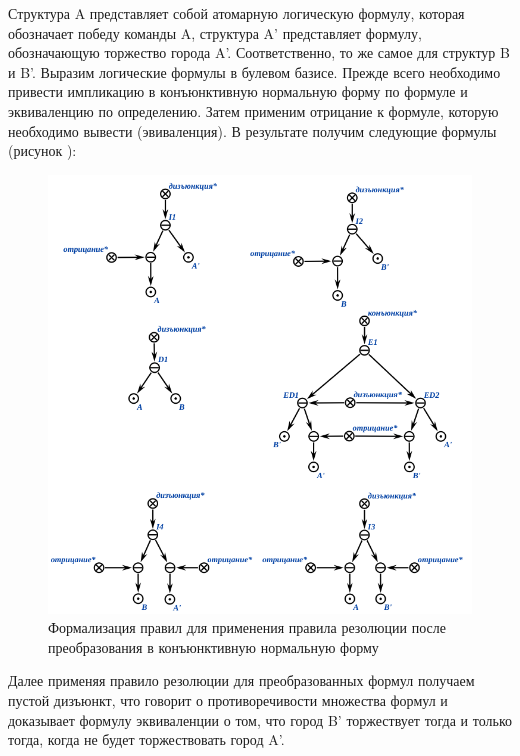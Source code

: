 Структура A представляет собой атомарную логическую формулу, которая обозначает победу команды A, структура A' представляет формулу, обозначающую торжество города A'. Соответственно, то же самое для структур B и B'.
Выразим логические формулы в булевом базисе. Прежде всего необходимо привести импликацию в конъюнктивную нормальную форму по формуле  и эквиваленцию по определению. Затем применим отрицание к формуле, которую необходимо вывести (эвиваленция). В результате получим следующие формулы (рисунок ):

\begin{figure}[H]
	\includegraphics[scale=0.8]{author/part3/figures/resolution_prepared_formulas_example.png}
	\caption{Формализация правил для применения правила резолюции после преобразования в конъюнктивную нормальную форму}
	\label{fig:resolution_prepared_formulas}
\end{figure}

Далее применяя правило резолюции для преобразованных формул получаем пустой дизъюнкт, что говорит о противоречивости множества формул и доказывает формулу эквиваленции о том, что город B' торжествует тогда и только тогда, когда не будет торжествовать город A'.

